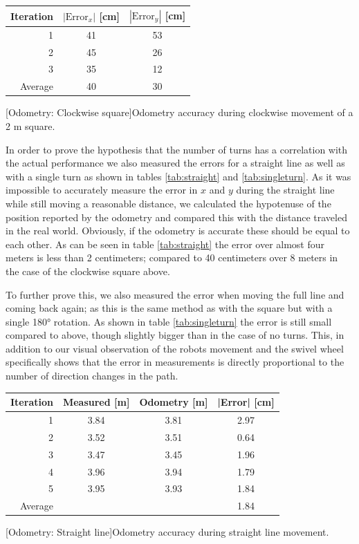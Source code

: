 \documentclass[11pt]{article}
\begin{document}
\begin{center}
  \begin{tabular}{r|cc}
    Iteration & $|\text{Error}_x|$ [cm] & $|\text{Error}_y|$ [cm] \\ \hline
    1 & 41 & 53 \\
    2 & 45 & 26 \\
    3 & 35 & 12 \\ \hline
    Average & 40 & 30         
  \end{tabular}
  [Odometry: Clockwise square]{Odometry accuracy during
    clockwise movement of a 2 m square.\label{tab:cw}}\par
\end{center}
In order to prove the hypothesis that the number of turns has a correlation with
the actual performance we also measured the errors for a straight line as well as with a single turn as shown in tables \ref{tab:straight} and
\vref{tab:singleturn}. As it was impossible to accurately measure the error in
$x$ and $y$ during the straight line while still moving a reasonable distance,
we calculated the hypotenuse of the position reported by the odometry and
compared this with the distance traveled in the real world. Obviously, if the
odometry is accurate these should be equal to each other. As can be seen in
table \ref{tab:straight} the error over almost four meters is less than 2 centimeters;
compared to 40 centimeters over 8 meters in the case of the clockwise square
above. \par
To further prove this, we also measured the error when moving the full line and
coming back again; as this is the same method as with the square but with a
single \ang{180} rotation. As shown in table \ref{tab:singleturn} the error is
still small compared to above, though slightly bigger than in the case of no
turns. This, in addition to our visual observation of the robots
movement and the swivel wheel specifically shows that the error in measurements is directly proportional to the number of direction changes in the path.
\begin{center}\begin{tabular}{r|ccc}
                Iteration & Measured [m] & Odometry [m] & |Error| [cm] \\ \hline
                1 & 3.84 & 3.81 & 2.97 \\
                2 & 3.52 & 3.51 & 0.64 \\
                3 & 3.47 & 3.45 & 1.96 \\
                4 & 3.96 & 3.94 & 1.79 \\
                5 & 3.95 & 3.93 & 1.84 \\ \hline
                Average & & & 1.84
              \end{tabular}
              [Odometry: Straight line]{Odometry accuracy
                during straight line movement.\label{tab:straight}}\par
            \end{center}
\end{document}

